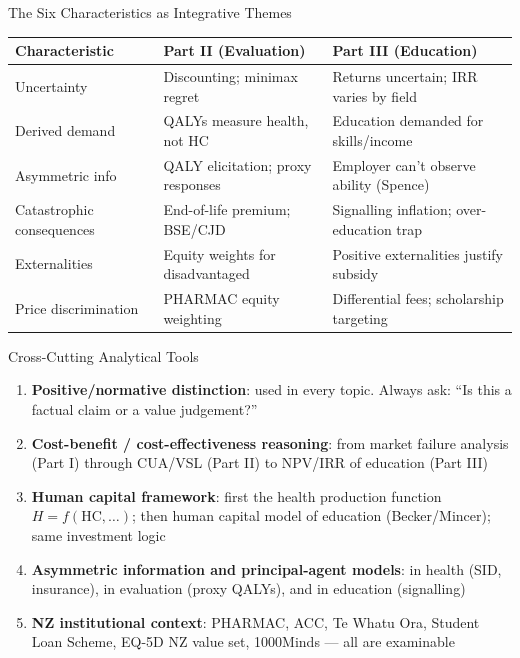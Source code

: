 \documentclass[aspectratio=169, 12pt]{beamer}
\begin{document}
\begin{frame}{The Six Characteristics as Integrative Themes}
  \begin{center}
    \footnotesize
    \begin{tabular}{@{}p{2.6cm}p{3.4cm}p{3.4cm}@{}}
      \toprule
      \textbf{Characteristic} & \textbf{Part II (Evaluation)} & \textbf{Part III (Education)} \\
      \midrule
      Uncertainty & Discounting; minimax regret & Returns uncertain; IRR varies by field \\
      Derived demand & QALYs measure health, not HC & Education demanded for skills/income \\
      Asymmetric info & QALY elicitation; proxy responses & Employer can't observe ability (Spence) \\
      Catastrophic consequences & End-of-life premium; BSE/CJD & Signalling inflation; over-education trap \\
      Externalities & Equity weights for disadvantaged & Positive externalities justify subsidy \\
      Price discrimination & PHARMAC equity weighting & Differential fees; scholarship targeting \\
      \bottomrule
    \end{tabular}
  \end{center}
\end{frame}

\begin{frame}{Cross-Cutting Analytical Tools}
  \begin{enumerate}
    \item \textbf{Positive/normative distinction}: used in every topic. Always ask: ``Is this
          a factual claim or a value judgement?''
    \vspace{0.3em}
    \item \textbf{Cost-benefit / cost-effectiveness reasoning}: from market failure analysis
          (Part I) through CUA/VSL (Part II) to NPV/IRR of education (Part III)
    \vspace{0.3em}
    \item \textbf{Human capital framework}: first the health production function $H = f(\text{HC},\ldots)$;
          then human capital model of education (Becker/Mincer); same investment logic
    \vspace{0.3em}
    \item \textbf{Asymmetric information and principal-agent models}: in health (SID, insurance),
          in evaluation (proxy QALYs), and in education (signalling)
    \vspace{0.3em}
    \item \textbf{NZ institutional context}: PHARMAC, ACC, Te Whatu Ora, Student Loan Scheme,
          EQ-5D NZ value set, 1000Minds --- all are examinable
  \end{enumerate}
\end{frame}
\end{document}
